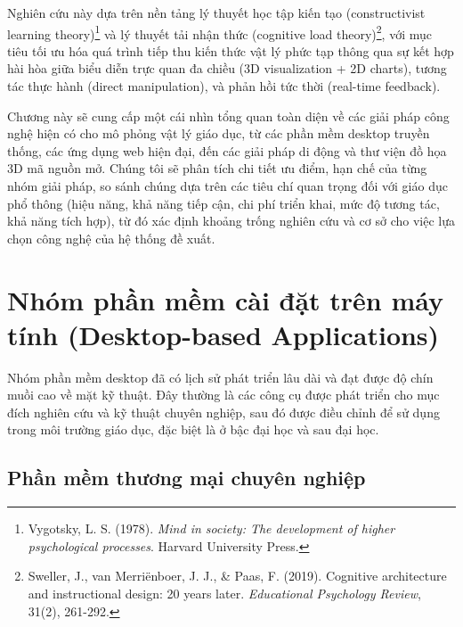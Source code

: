 Nghiên cứu này dựa trên nền tảng lý thuyết học tập kiến tạo (constructivist learning theory)\footnote{Vygotsky, L. S. (1978). \textit{Mind in society: The development of higher psychological processes}. Harvard University Press.} và lý thuyết tải nhận thức (cognitive load theory)\footnote{Sweller, J., van Merriënboer, J. J., \& Paas, F. (2019). Cognitive architecture and instructional design: 20 years later. \textit{Educational Psychology Review}, 31(2), 261-292.}, với mục tiêu tối ưu hóa quá trình tiếp thu kiến thức vật lý phức tạp thông qua sự kết hợp hài hòa giữa biểu diễn trực quan đa chiều (3D visualization + 2D charts), tương tác thực hành (direct manipulation), và phản hồi tức thời (real-time feedback).

Chương này sẽ cung cấp một cái nhìn tổng quan toàn diện về các giải pháp công nghệ hiện có cho mô phỏng vật lý giáo dục, từ các phần mềm desktop truyền thống, các ứng dụng web hiện đại, đến các giải pháp di động và thư viện đồ họa 3D mã nguồn mở. Chúng tôi sẽ phân tích chi tiết ưu điểm, hạn chế của từng nhóm giải pháp, so sánh chúng dựa trên các tiêu chí quan trọng đối với giáo dục phổ thông (hiệu năng, khả năng tiếp cận, chi phí triển khai, mức độ tương tác, khả năng tích hợp), từ đó xác định khoảng trống nghiên cứu và cơ sở cho việc lựa chọn công nghệ của hệ thống đề xuất.

\section{Nhóm phần mềm cài đặt trên máy tính (Desktop-based Applications)}

Nhóm phần mềm desktop đã có lịch sử phát triển lâu dài và đạt được độ chín muồi cao về mặt kỹ thuật. Đây thường là các công cụ được phát triển cho mục đích nghiên cứu và kỹ thuật chuyên nghiệp, sau đó được điều chỉnh để sử dụng trong môi trường giáo dục, đặc biệt là ở bậc đại học và sau đại học.

\subsection{Phần mềm thương mại chuyên nghiệp}

